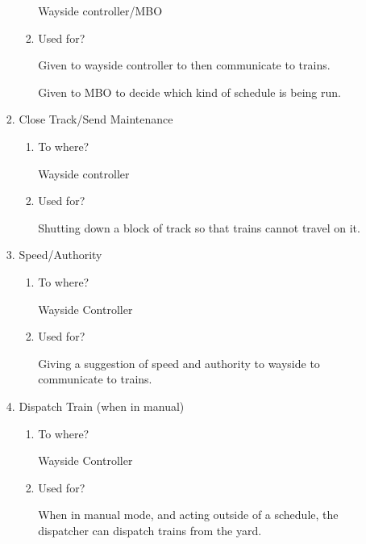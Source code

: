 \documentclass[11pt]{article}
\begin{document}
\begin{enumerate}
\begin{enumerate}
\begin{enumerate}
\begin{enumerate}
Wayside controller/MBO
\item Used for?
\label{sec-3-1-1-5-2-1-2}

Given to wayside controller to then communicate to trains. 

Given to MBO to decide which kind of schedule is being run.
\end{enumerate}
\item Close Track/Send Maintenance
\label{sec-3-1-1-5-2-2}
\begin{enumerate}
\item To where?
\label{sec-3-1-1-5-2-2-1}

Wayside controller
\item Used for?
\label{sec-3-1-1-5-2-2-2}

Shutting down a block of track so that trains cannot travel on it.
\end{enumerate}
\item Speed/Authority
\label{sec-3-1-1-5-2-3}
\begin{enumerate}
\item To where?
\label{sec-3-1-1-5-2-3-1}

Wayside Controller
\item Used for?
\label{sec-3-1-1-5-2-3-2}

Giving a suggestion of speed and authority to wayside to communicate to trains.
\end{enumerate}
\item Dispatch Train (when in manual)
\label{sec-3-1-1-5-2-4}
\begin{enumerate}
\item To where?
\label{sec-3-1-1-5-2-4-1}

Wayside Controller
\item Used for?
\label{sec-3-1-1-5-2-4-2}

When in manual mode, and acting outside of a schedule, the dispatcher can dispatch trains from the yard.
\end{enumerate}
\end{enumerate}
\end{enumerate}
\end{enumerate}
\end{document}
